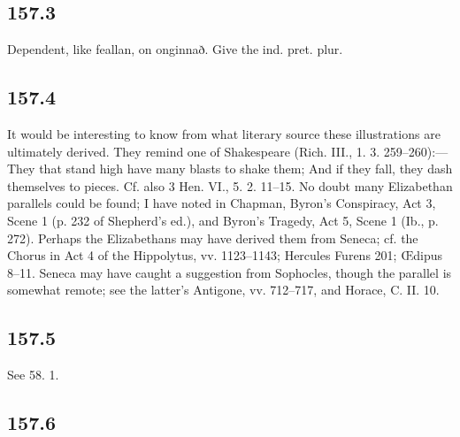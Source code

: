 \subsection*{157.3}

Dependent, like feallan, on onginnað. Give the ind. pret. plur.

\subsection*{157.4}

It would be interesting to know from what literary source these illustrations are ultimately derived. They remind one of Shakespeare (Rich. III., 1. 3. 259–260):— They that stand high have many blasts to shake them; And if they fall, they dash themselves to pieces. Cf. also 3 Hen. VI., 5. 2. 11–15. No doubt many Elizabethan parallels could be found; I have noted in Chapman, Byron’s Conspiracy, Act 3, Scene 1 (p. 232 of Shepherd’s ed.), and Byron’s Tragedy, Act 5, Scene 1 (Ib., p. 272). Perhaps the Elizabethans may have derived them from Seneca; cf. the Chorus in Act 4 of the Hippolytus, vv. 1123–1143; Hercules Furens 201; Œdipus 8–11. Seneca may have caught a suggestion from Sophocles, though the parallel is somewhat remote; see the latter’s Antigone, vv. 712–717, and Horace, C. II. 10.

\subsection*{157.5}

See 58. 1.

\subsection*{157.6}

